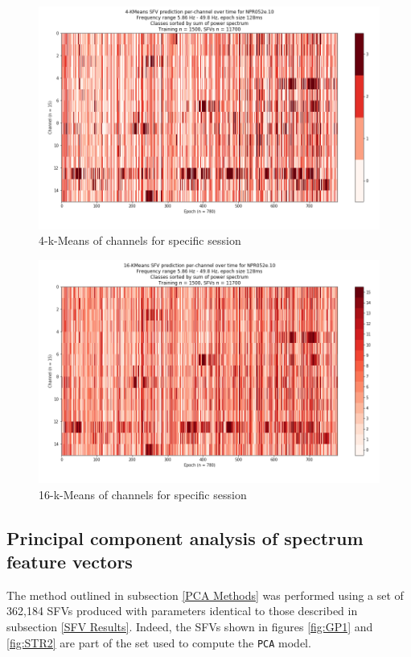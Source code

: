 \documentclass{article}
\begin{document}
\begin{figure}[H]
    \centering
    \centerline{\includegraphics[width=1\textwidth]{images/KM4.png}}
    \caption{4-k-Means of channels for specific session}
    \label{fig:KM4}
\end{figure}

\begin{figure}[H]
    \centering
    \centerline{\includegraphics[width=1\textwidth]{images/KM16.png}}
    \caption{16-k-Means of channels for specific session}
    \label{fig:KM16}
\end{figure}

\subsection{Principal component analysis of spectrum feature vectors}\label{PCA Results}

The method outlined in subsection \ref{PCA Methods} was performed using a set of 362,184 SFVs produced with parameters identical to those described in subsection \ref{SFV Results}.
Indeed, the SFVs shown in figures \ref{fig:GP1} and \ref{fig:STR2} are part of the set used to compute the \texttt{PCA} model.
\end{document}
